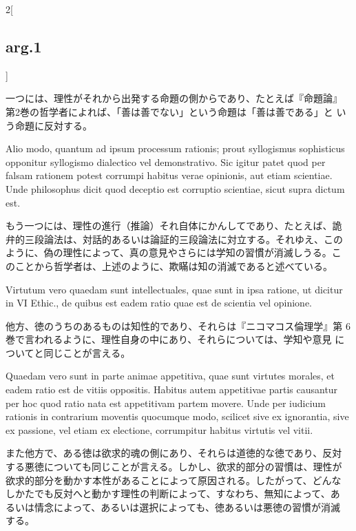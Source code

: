 \documentclass[paper=a4paper,fontsize=10pt,jafontsize=9pt,titlepage]{jlreq}
\begin{document}
\begin{paracol}{2}[\subsection{arg.1}]
\switchcolumn

一つには、理性がそれから出発する命題の側からであり、たとえば『命題論』
第2巻の哲学者によれば、「善は善でない」という命題は「善は善である」と
いう命題に反対する。

\switchcolumn*

Alio modo, quantum ad ipsum processum rationis; prout syllogismus
sophisticus opponitur syllogismo dialectico vel demonstrativo. Sic
igitur patet quod per falsam rationem potest corrumpi habitus verae
opinionis, aut etiam scientiae. Unde philosophus dicit quod deceptio
est corruptio scientiae, sicut supra dictum est.

\switchcolumn

もう一つには、理性の進行（推論）それ自体にかんしてであり、たとえば、詭
弁的三段論法は、対話的あるいは論証的三段論法に対立する。それゆえ、この
ように、偽の理性によって、真の意見やさらには学知の習慣が消滅しうる。こ
のことから哲学者は、上述のように、欺瞞は知の消滅であると述べている。

\switchcolumn*

Virtutum vero quaedam sunt intellectuales, quae sunt in ipsa ratione,
ut dicitur in VI Ethic., de quibus est eadem ratio quae est de
scientia vel opinione.

\switchcolumn

他方、徳のうちのあるものは知性的であり、それらは『ニコマコス倫理学』第
6巻で言われるように、理性自身の中にあり、それらについては、学知や意見
についてと同じことが言える。

\switchcolumn*

Quaedam vero sunt in parte animae appetitiva, quae sunt virtutes
morales, et eadem ratio est de vitiis oppositis. Habitus autem
appetitivae partis causantur per hoc quod ratio nata est appetitivam
partem movere. Unde per iudicium rationis in contrarium moventis
quocumque modo, scilicet sive ex ignorantia, sive ex passione, vel
etiam ex electione, corrumpitur habitus virtutis vel vitii.

\switchcolumn

また他方で、ある徳は欲求的魂の側にあり、それらは道徳的な徳であり、反対
する悪徳についても同じことが言える。しかし、欲求的部分の習慣は、理性が
欲求的部分を動かす本性があることによって原因される。したがって、どんな
しかたでも反対へと動かす理性の判断によって、すなわち、無知によって、あ
るいは情念によって、あるいは選択によっても、徳あるいは悪徳の習慣が消滅
する。

\switchcolumn*[\subsection{ad.1}]


\end{paracol}
\end{document}
